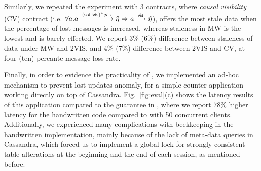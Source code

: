 Similarly, we repeated the experiment with 3 \UB{} contracts, where
\emph{causal visibility} (CV) contract (i.e. {\footnotesize $ \forall a.
a\xrightarrow{({\textsf{so}}\cup{\normalfont \textsf{vis}})^*;{\normalfont \textsf{vis}}}\hat{\eta}\Rightarrow a\xrightarrow{{\normalfont \textsf{vis}}}
\hat{\eta} $}), offers the most stale data when the percentage of lost
messages is increased, whereas staleness in MW is the lowest and is
barely effected. We report $3\%$ ($6\%$) difference 
between staleness of data under MW and 2VIS, and $4\%$ ($7\%$)
difference between 2VIS and CV,
at four (ten) percante message
loss rate.



Finally, in order to evidence the practicality of \tool, we implemented
an ad-hoc mechanism to prevent lost-updates anomaly, for a simple
counter application working directly on top of Cassandra. Fig.~\ref{fig:eval}(c) shows the latency results of
this application compared to the \rmwCTRT{} guarantee in \tool, where we report $78\%$
higher latency for the handwritten code compared to \tool with 50
concurrent clients.
Additionally, we experienced many complications with beekkeeping in the handwritten
implementation, mainly because of the lack of meta-data queries in
Cassandra, which forced us to implement a global lock for strongly
consistent table alterations at 
the beginning and the end of each session, as mentioned before.










































